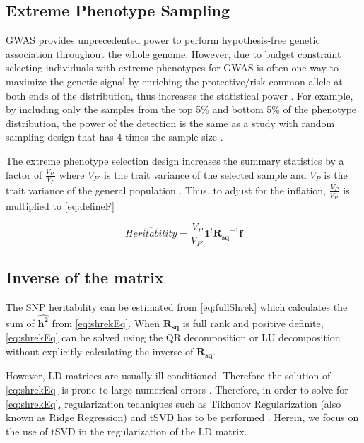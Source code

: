 		\subsection{Extreme Phenotype Sampling}
			\gls{GWAS} provides unprecedented power to perform hypothesis-free genetic association throughout the whole genome.
			However, due to budget constraint selecting individuals with extreme phenotypes for \gls{GWAS} is often one way to maximize the genetic signal by enriching the protective/risk common allele at both ends of the distribution, thus increases the statistical power \citep{Guey2011}.
			For example, by including only the samples from the top 5\% and bottom 5\% of the phenotype distribution, the power of the detection is the same as a study with random sampling design that has 4 times the sample size \citep{Sham2014}. 
			
			The extreme phenotype selection design increases the summary statistics by a factor of $\frac{V_{P'}}{V_P}$ where $V_{P'}$ is the trait variance of the selected sample and $V_P$ is the trait variance of the general population \citep{Sham2014}.
			Thus, to adjust for the inflation, $\frac{V_P}{V_{P'}}$ is multiplied to \cref{eq:defineF}
			
			\begin{equation}
			\hat{Heritability} = \frac{V_P}{V_{P'}}\boldsymbol{1}^t\boldsymbol{R_{sq}}^{-1}\boldsymbol{f}
			\label{eq:extremeShrek}
			\end{equation}
			
		\subsection{Inverse of the  matrix}
			The \gls{SNP} heritability can be estimated from \cref{eq:fullShrek} which calculates the sum of $\boldsymbol{\hat{h^2}}$ from \cref{eq:shrekEq}.
			When $\boldsymbol{R_{sq}}$ is full rank and positive definite, \cref{eq:shrekEq} can be solved using the QR decomposition or LU decomposition without explicitly calculating the inverse of $\boldsymbol{R_{sq}}$.
			
			However, \gls{LD} matrices are usually ill-conditioned.
			Therefore the solution of \cref{eq:shrekEq} is prone to large numerical errors \citep{Neumaier1998}.
			Therefore, in order to solve for \cref{eq:shrekEq}, regularization techniques such as Tikhonov Regularization (also known as Ridge Regression) and \gls{tSVD} has to be performed \citep{Neumaier1998}. 
			Herein, we focus on the use of \gls{tSVD} in the regularization of the \gls{LD} matrix.
			
